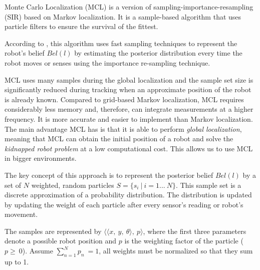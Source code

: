 Monte Carlo Localization (MCL) is a version of sampling-importance-resampling (SIR) based on Markov localization. It is a sample-based algorithm that uses particle filters to ensure the survival of the fittest.

According to \citet{Montecarlo}, this algorithm uses fast sampling techniques to represent the robot's belief $Bel(l)$ by estimating the posterior distribution every time the robot moves or senses using the importance re-sampling technique.

MCL uses many samples during the global localization and the sample set size is significantly reduced during tracking when an approximate position of the robot is already known. Compared to grid-based Markov localization, MCL requires considerably less memory and, therefore, can integrate measurements at a higher frequency. It is more accurate and easier to implement than Markov localization. The main advantage MCL has is that it is able to perform \textit{global localization}, meaning that MCL can obtain the initial position of a robot and solve the \textit{kidnapped robot problem} at a low computational cost. This allows us to use MCL in bigger environments.

The key concept of this approach is to represent the posterior belief $Bel(l)$ by a set of $N$ weighted, random particles $S=\lbrace s_i\  \vert \ i=1...\ N\rbrace$. This sample set is a discrete approximation of a probability distribution. The distribution is updated by updating the weight of each particle after every sensor's reading or robot's movement.

The samples are represented by $\langle\langle x,\ y,\ \theta\rangle,\ p\rangle$, where the first three parameters denote a possible robot position  and $p$ is the weighting factor of the particle ($p\geq\ 0$). Assume $\sum_{n=1}^{N} p_n\ = 1$, all weights must be normalized so that they sum up to 1.

